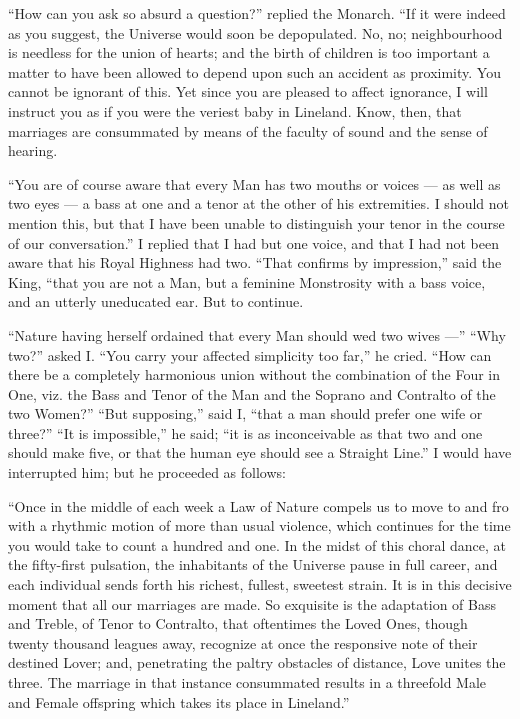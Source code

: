 \documentclass[12pt, a4paper, twoside]{memoir}
\begin{document}
``How can you ask so absurd a question?'' replied the Monarch. ``If it were
indeed as you suggest, the Universe would soon be depopulated. No, no;
neighbourhood is needless for the union of hearts; and the birth of children
is too important a matter to have been allowed to depend upon such an accident
as proximity. You cannot be ignorant of this. Yet since you are pleased to
affect ignorance, I will instruct you as if you were the veriest baby in
Lineland. Know, then, that marriages are consummated by means of the faculty
of sound and the sense of hearing.

``You are of course aware that every Man has two mouths or voices --- as well as
two eyes --- a bass at one and a tenor at the other of his extremities. I should
not mention this, but that I have been unable to distinguish your tenor in the
course of our conversation.'' I replied that I had but one voice, and that I
had not been aware that his Royal Highness had two. ``That confirms by
impression,'' said the King, ``that you are not a Man, but a feminine
Monstrosity with a bass voice, and an utterly uneducated ear. But to continue.

``Nature having herself ordained that every Man should wed two wives ---'' ``Why
two?'' asked I. ``You carry your affected simplicity too far,'' he cried. ``How
can there be a completely harmonious union without the combination of the Four
in One, viz. the Bass and Tenor of the Man and the Soprano and Contralto of
the two Women?'' ``But supposing,'' said I, ``that a man should prefer one wife or
three?'' ``It is impossible,'' he said; ``it is as inconceivable as that two and
one should make five, or that the human eye should see a Straight Line.'' I
would have interrupted him; but he proceeded as follows:

``Once in the middle of each week a Law of Nature compels us to move to and fro
with a rhythmic motion of more than usual violence, which continues for the
time you would take to count a hundred and one. In the midst of this choral
dance, at the fifty-first pulsation, the inhabitants of the Universe pause in
full career, and each individual sends forth his richest, fullest, sweetest
strain. It is in this decisive moment that all our marriages are made. So
exquisite is the adaptation of Bass and Treble, of Tenor to Contralto, that
oftentimes the Loved Ones, though twenty thousand leagues away, recognize at
once the responsive note of their destined Lover; and, penetrating the paltry
obstacles of distance, Love unites the three. The marriage in that instance
consummated results in a threefold Male and Female offspring which takes its
place in Lineland.''
\end{document}
